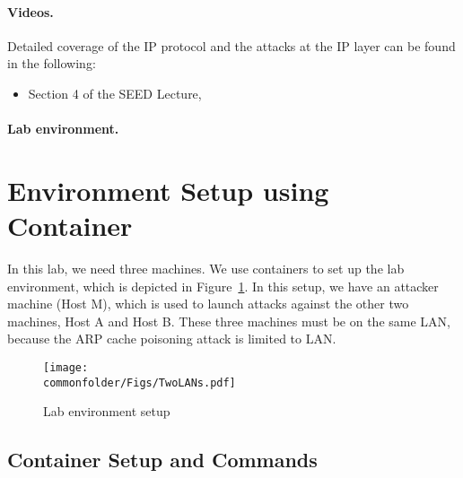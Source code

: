 \paragraph{Videos.}
Detailed coverage of the IP protocol and the attacks at the IP layer can be found 
in the following:

\begin{itemize}
\item Section 4 of the SEED Lecture, \seedisvideo
\end{itemize}


\paragraph{Lab environment.} \seedenvironmentB



\section{Environment Setup using Container}

In this lab, we need three machines. We use
containers to set up the lab environment, which is depicted
in Figure~\ref{ip:fig:labsetup}.
In this setup, we have an attacker machine (Host M),
which is used to launch attacks against the other two machines, Host A and
Host B.  These three machines must be on the same LAN,
because the ARP cache poisoning attack is limited to LAN.

\begin{figure}[htb]
\begin{center}
\texttt{[image: \\commonfolder/Figs/TwoLANs.pdf]}
\end{center}
\caption{Lab environment setup}
\label{ip:fig:labsetup}
\end{figure}



\subsection{Container Setup and Commands}




